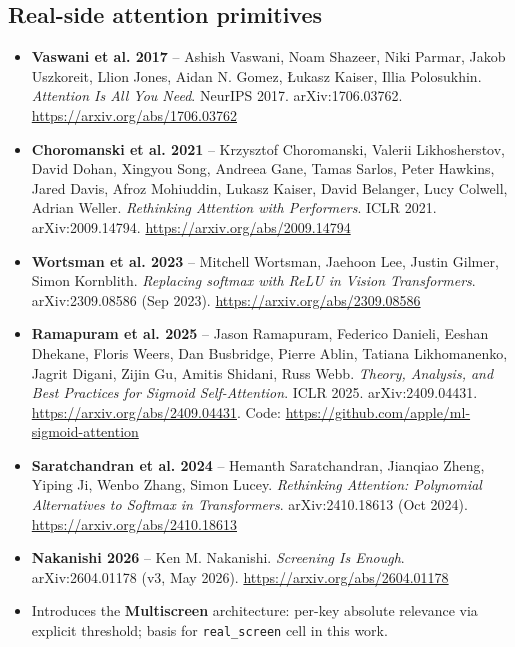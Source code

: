 \documentclass[11pt,a4paper]{article}
\theoremstyle{plain}
\theoremstyle{definition}
\begin{document}
\subsection*{Real-side attention primitives}
\begin{itemize}
  \item \textbf{Vaswani et al. 2017} -- Ashish Vaswani, Noam Shazeer, Niki Parmar, Jakob Uszkoreit, Llion Jones, Aidan N. Gomez, \L{}ukasz Kaiser, Illia Polosukhin. \emph{Attention Is All You Need}. NeurIPS 2017. arXiv:1706.03762. \url{https://arxiv.org/abs/1706.03762}
  \item \textbf{Choromanski et al. 2021} -- Krzysztof Choromanski, Valerii Likhosherstov, David Dohan, Xingyou Song, Andreea Gane, Tamas Sarlos, Peter Hawkins, Jared Davis, Afroz Mohiuddin, Lukasz Kaiser, David Belanger, Lucy Colwell, Adrian Weller. \emph{Rethinking Attention with Performers}. ICLR 2021. arXiv:2009.14794. \url{https://arxiv.org/abs/2009.14794}
  \item \textbf{Wortsman et al. 2023} -- Mitchell Wortsman, Jaehoon Lee, Justin Gilmer, Simon Kornblith. \emph{Replacing softmax with ReLU in Vision Transformers}. arXiv:2309.08586 (Sep 2023). \url{https://arxiv.org/abs/2309.08586}
  \item \textbf{Ramapuram et al. 2025} -- Jason Ramapuram, Federico Danieli, Eeshan Dhekane, Floris Weers, Dan Busbridge, Pierre Ablin, Tatiana Likhomanenko, Jagrit Digani, Zijin Gu, Amitis Shidani, Russ Webb. \emph{Theory, Analysis, and Best Practices for Sigmoid Self-Attention}. ICLR 2025. arXiv:2409.04431. \url{https://arxiv.org/abs/2409.04431}. Code: \url{https://github.com/apple/ml-sigmoid-attention}
  \item \textbf{Saratchandran et al. 2024} -- Hemanth Saratchandran, Jianqiao Zheng, Yiping Ji, Wenbo Zhang, Simon Lucey. \emph{Rethinking Attention: Polynomial Alternatives to Softmax in Transformers}. arXiv:2410.18613 (Oct 2024). \url{https://arxiv.org/abs/2410.18613}
  \item \textbf{Nakanishi 2026} -- Ken M. Nakanishi. \emph{Screening Is Enough}. arXiv:2604.01178 (v3, May 2026). \url{https://arxiv.org/abs/2604.01178}
  \item Introduces the \textbf{Multiscreen} architecture: per-key absolute relevance via explicit threshold; basis for \texttt{real\_screen} cell in this work.
\end{itemize}
\end{document}
